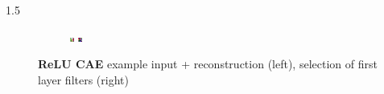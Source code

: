 \documentclass[final]{beamer}
\newlength{\onecolwid}
\newlength{\threecolwid}
\begin{document}
\begin{frame}[t]
\begin{columns}[t]
\begin{column}{\threecolwid}
\begin{alertblock}
\begin{columns}[t]
\begin{column}{1.5\onecolwid}
\begin{figure}
\begin{subfigure}{0.4\linewidth}
					\includegraphics[width=0.1\linewidth]{../graphics/reconstructions/cifar/relu/relu_filter_07.png} \hspace{0.05\linewidth}
					\includegraphics[width=0.1\linewidth]{../graphics/reconstructions/cifar/relu/relu_filter_08.png} 


				\end{subfigure}

			\caption{\textbf{ReLU CAE} example input + reconstruction (left), selection of first layer filters (right) }
			\label{fig:relu_cae}

			\end{figure}
		
		\end{column}



\end{columns}

\end{alertblock}


\end{column}
\end{columns} %


\end{frame} %
\end{document}
